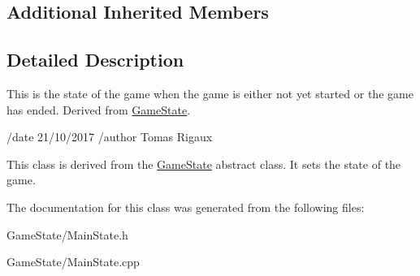 \subsection*{Additional Inherited Members}


\subsection{Detailed Description}
This is the state of the game when the game is either not yet started or the game has ended. Derived from \hyperlink{classGameState}{Game\-State}. 

/date 21/10/2017 /author Tomas Rigaux

This class is derived from the \hyperlink{classGameState}{Game\-State} abstract class. It sets the state of the game. 

The documentation for this class was generated from the following files\-:\begin{DoxyCompactItemize}
\item 
Game\-State/Main\-State.\-h\item 
Game\-State/Main\-State.\-cpp\end{DoxyCompactItemize}
